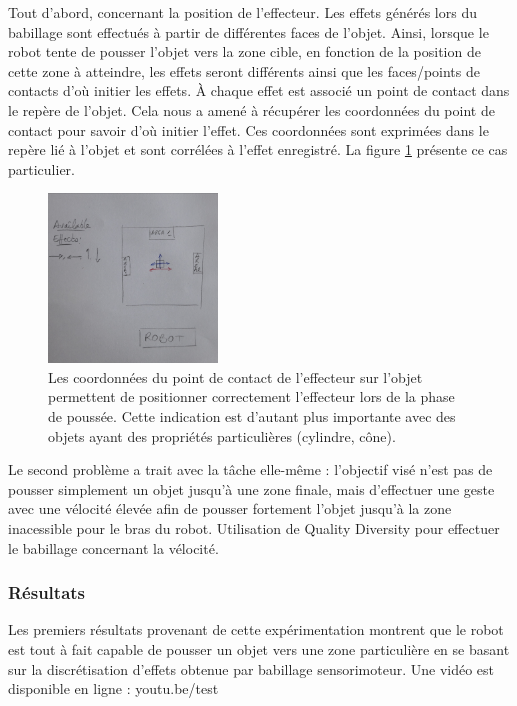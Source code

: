 \documentclass{llncs}
\begin{document}
Tout d'abord, concernant la position de l'effecteur. Les effets générés lors du babillage sont effectués à partir de différentes faces de l'objet. Ainsi, lorsque le robot tente de pousser l'objet vers la zone cible, en fonction de la position de cette zone à atteindre, les effets seront différents ainsi que les faces/points de contacts d'où initier les effets. \`A chaque effet est associé un point de contact dans le repère de l'objet. Cela nous a amené à récupérer les coordonnées du point de contact pour savoir d'où initier l'effet. Ces coordonnées sont exprimées dans le repère lié à l'objet et sont corrélées à l'effet enregistré. La figure \ref{fig:contact_position} présente ce cas particulier.



\begin{figure}[ht]
  \begin{center}
  \includegraphics[width=0.4\textwidth]{figures/contact_position.jpg}
    \caption{Les coordonnées du point de contact de l'effecteur sur l'objet permettent de positionner correctement l'effecteur lors de la phase de poussée. Cette indication est d'autant plus importante avec des objets ayant des propriétés particulières (cylindre, cône).}
  \label{fig:contact_position}
  \end{center}
\end{figure}

Le second problème a trait avec la tâche elle-même : l'objectif visé n'est pas de pousser simplement un objet jusqu'à une zone finale, mais d'effectuer une geste avec une vélocité élevée afin de pousser fortement l'objet jusqu'à la zone inacessible pour le bras du robot. Utilisation de Quality Diversity pour effectuer le babillage concernant la vélocité.

\subsubsection{Résultats}
Les premiers résultats provenant de cette expérimentation montrent que le robot est tout à fait capable de pousser un objet vers une zone particulière en se basant sur la discrétisation d'effets obtenue par babillage sensorimoteur. Une vidéo est disponible en ligne : youtu.be/test
\end{document}

